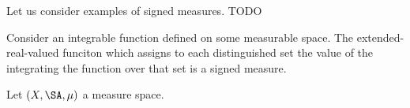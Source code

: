 
\sbasic



\sstart



Let us consider
examples of signed measures.
TODO


Consider an integrable
function defined on
some measurable space.
The extended-real-valued
funciton which assigns to
each distinguished set the
value of the integrating
the function over that set
is a signed measure.

\begin{expl}
  Let $(X, \SA, \mu)$
  a measure space.
\end{expl}

\strats
